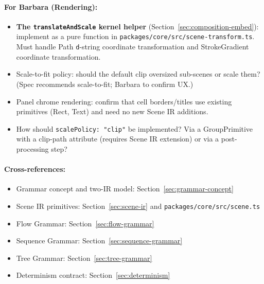 \paragraph{For Barbara (Rendering):}
\begin{itemize}
  \item \textbf{The \texttt{translateAndScale} kernel helper} (Section~\ref{sec:composition-embed}): implement as a pure function in \texttt{packages/core/src/scene-transform.ts}.  Must handle Path \texttt{d}-string coordinate transformation and StrokeGradient coordinate transformation.
  \item Scale-to-fit policy: should the default clip oversized sub-scenes or scale them?  (Spec recommends scale-to-fit; Barbara to confirm UX.)
  \item Panel chrome rendering: confirm that cell borders/titles use existing primitives (Rect, Text) and need no new Scene IR additions.
  \item How should \texttt{scalePolicy: "clip"} be implemented?  Via a GroupPrimitive with a clip-path attribute (requires Scene IR extension) or via a post-processing step?
\end{itemize}

\paragraph{Cross-references:}
\begin{itemize}
  \item Grammar concept and two-IR model: Section~\ref{sec:grammar-concept}
  \item Scene IR primitives: Section~\ref{sec:scene-ir} and \texttt{packages/core/src/scene.ts}
  \item Flow Grammar: Section~\ref{sec:flow-grammar}
  \item Sequence Grammar: Section~\ref{sec:sequence-grammar}
  \item Tree Grammar: Section~\ref{sec:tree-grammar}
  \item Determinism contract: Section~\ref{sec:determinism}
\end{itemize}
